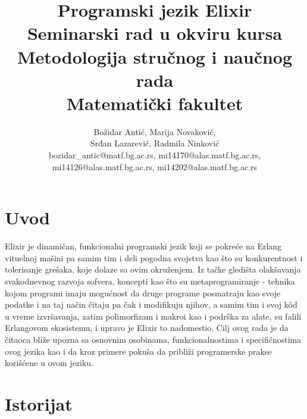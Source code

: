 \documentclass[a4paper]{article}
\begin{document}
\title{Programski jezik Elixir\\ \small{Seminarski rad u okviru kursa\\Metodologija stručnog i naučnog rada\\ Matematički fakultet}}

\author{Božidar Antić, Marija Novaković,\\ Srđan Lazarević, Radmila Ninković\\bozidar\_antic@matf.bg.ac.rs, mi14170@alas.matf.bg.ac.rs,\\ mi14126@alas.matf.bg.ac.rs, mi14202@alas.matf.bg.ac.rs}


\maketitle


\tableofcontents

\newpage

\section{Uvod}
\label{sec:uvod}

Elixir je dinamičan, funkcionalni programski jezik koji se pokreće na Erlang vituelnoj mašini pa samim tim i deli pogodna svojstva kao što su konkurentnost i tolerisanje grešaka, koje dolaze sa ovim okruženjem.\cite{knjigaElixir} Iz tačke gledišta olakšavanja svakodnevnog razvoja sofvera, koncepti kao što su metaprogramiranje - tehnika kojom programi imaju mogućnost da druge programe posmatraju kao svoje podatke i na taj način čitaju pa čak i modifikuju njihov, a samim tim i svoj kôd u vreme izvršavanja, zatim polimorfizam i makroi kao i podrška za alate, su falili Erlangovom ekosistemu, i upravo je Elixir to nadomestio. Cilj ovog rada je da čitaoca bliže upozna sa osnovnim osobinama, funkcionalnostima i specifičnostima ovog jezika kao i da kroz primere pokuša da približi programerske prakse korišćene u ovom jeziku.

\section{Istorijat}
\label{sec:istorijat}
\end{document}
